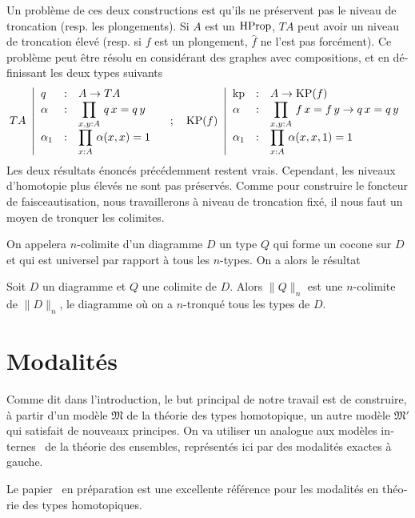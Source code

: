 \begin{otherlanguage}{french}
Un problème de ces deux constructions est qu'ils ne préservent pas le
niveau de troncation (resp. les plongements). Si $A$ est un $\operatorname{HProp}$,
$TA$ peut avoir un niveau de troncation élevé (resp. si $f$ est un
plongement, $\widehat f$ ne l'est pas forcément). Ce problème peut
être résolu en considérant des graphes avec compositions, et en
définissant les deux types suivants
\[
  TA~\left|
    \begin{array}{lll}
      q&:& A\to TA \\
      \alpha&:& \displaystyle{\prod_{x,y:A}\, q\, x = q\, y} \\
      \alpha_1&:& \displaystyle{\prod_{x:A}\, \alpha(x,x) = 1}
    \end{array}
  \right.
  \quad ; \quad
  \operatorname{KP}(f)~\left|
    \begin{array}{lll}
      \operatorname{kp}&:&A\to \operatorname{KP}(f) \\
      \alpha&:& \displaystyle{\prod_{x,y:A}\, f\, x = f\, y \to q\, x = q\, y} \\
      \alpha_1&:& \displaystyle{\prod_{x:A}\, \alpha(x,x,1) = 1}
    \end{array}    
  \right.
\]
Les deux résultats énoncés précédemment restent vrais. Cependant, les
niveaux d'homotopie plus élevés ne sont pas préservés.
Comme pour construire le foncteur de faisceautisation, nous travaillerons à
niveau de troncation fixé, il nous faut un moyen de tronquer les
colimites.

On appelera $n$-colimite d'un diagramme $D$ un type $Q$ qui forme un
cocone sur $D$ et qui est universel par rapport à tous les
$n$-types. On a alors le résultat
\begin{lemfr}
  Soit $D$ un diagramme et $Q$ une colimite de $D$. Alors $\|Q\|_n$
  est une $n$-colimite de $\|D\|_n$, le diagramme où on a $n$-tronqué
  tous les types de $D$.
\end{lemfr}

\section{Modalités}

Comme dit dans l'introduction, le but principal de notre travail est
de construire, à partir d'un modèle $\mathfrak M$ de la théorie des
types homotopique, un autre modèle $\mathfrak M'$ qui satisfait 
de nouveaux principes.
On va utiliser un analogue aux modèles internes~\cite{kunen} de la
théorie des ensembles, représentés ici par des modalités exactes à
gauche.

Le papier~\cite{RijkeShulmanSpitters} en préparation est une
excellente référence pour les modalités en théorie des types homotopiques.


\end{otherlanguage}

